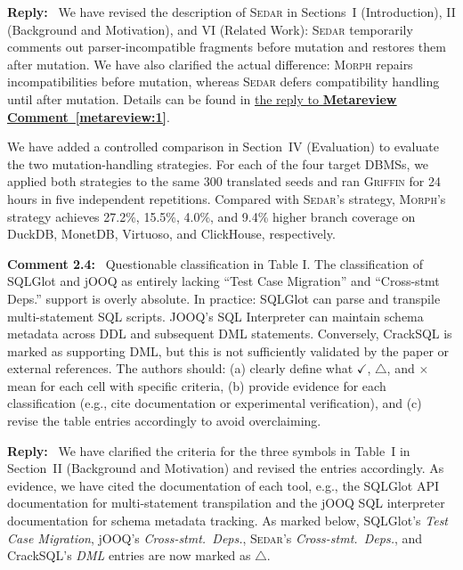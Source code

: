 \documentclass[12pt,letterpaper]{article}
\newcommand{\morph}{\textsc{Morph}}
\newcommand{\sedar}{\textsc{Sedar}}
\newcommand{\griffin}{\textsc{Griffin}}
\newcommand{\tool}{\morph}
\newcommand{\cmark}{\ensuremath{\checkmark}}
\newcommand{\xmark}{\ensuremath{\times}}
\providecommand{\partmark}{}
\renewcommand{\partmark}{\ensuremath{\triangle}}
\newcommand{\reviewstart}{\par\addvspace{0.85\baselineskip}\Needspace{4\baselineskip}\noindent}
\newcounter{commentanchor}
\newcommand{\reviewcomment}[1]{\reviewstart\renewcommand{\thecommentanchor}{#1}\refstepcounter{commentanchor}\label{comment:#1}\textbf{Comment #1:}\ }
\newcommand{\metareviewref}[1]{\hyperref[metareview:#1]{\uline{the reply to \textbf{Metareview Comment~\ref*{metareview:#1}}}}}
\newcommand{\reply}{\par\nobreak\noindent\textbf{Reply:}\ }
\begin{document}
\reply
We have revised the description of \sedar{} in Sections~I (Introduction), II (Background and Motivation), and VI (Related Work): \sedar{} temporarily comments out parser-incompatible fragments before mutation and restores them after mutation. We have also clarified the actual difference: \tool{} repairs incompatibilities before mutation, whereas \sedar{} defers compatibility handling until after mutation. Details can be found in \metareviewref{1}.

We have added a controlled comparison in Section~IV (Evaluation) to evaluate the two mutation-handling strategies. For each of the four target DBMSs, we applied both strategies to the same 300 translated seeds and ran \griffin{} for 24 hours in five independent repetitions. Compared with \sedar{}'s strategy, \tool{}'s strategy achieves 27.2\%, 15.5\%, 4.0\%, and 9.4\% higher branch coverage on DuckDB, MonetDB, Virtuoso, and ClickHouse, respectively.

\reviewcomment{2.4} Questionable classification in Table I. The classification of SQLGlot and jOOQ as entirely lacking ``Test Case Migration'' and ``Cross-stmt Deps.'' support is overly absolute. In practice: SQLGlot can parse and transpile multi-statement SQL scripts. JOOQ's SQL Interpreter can maintain schema metadata across DDL and subsequent DML statements. Conversely, CrackSQL is marked as supporting DML, but this is not sufficiently validated by the paper or external references. The authors should: (a) clearly define what \cmark{}, \partmark{}, and \xmark{} mean for each cell with specific criteria, (b) provide evidence for each classification (e.g., cite documentation or experimental verification), and (c) revise the table entries accordingly to avoid overclaiming.

\reply
We have clarified the criteria for the three symbols in Table~I in Section~II (Background and Motivation) and revised the entries accordingly. As evidence, we have cited the documentation of each tool, e.g., the SQLGlot API documentation for multi-statement transpilation and the jOOQ SQL interpreter documentation for schema metadata tracking. As marked below, SQLGlot's \textit{Test Case Migration}, jOOQ's \textit{Cross-stmt.\ Deps.}, \sedar{}'s \textit{Cross-stmt.\ Deps.}, and CrackSQL's \textit{DML} entries are now marked as \partmark{}.
\end{document}
